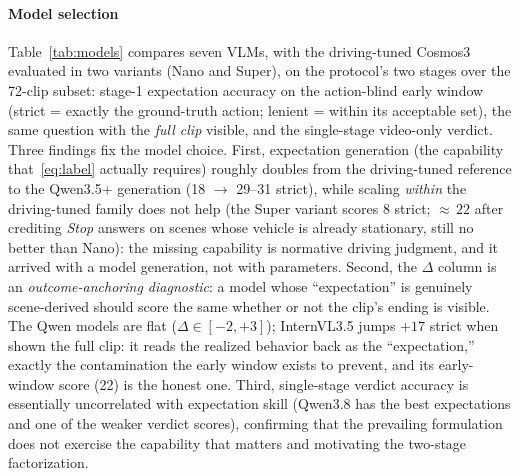 \documentclass[conference]{IEEEtran}
\begin{document}
\paragraph{Model selection} Table~\ref{tab:models} compares seven VLMs, with the driving-tuned Cosmos3 evaluated in two variants (Nano and Super), on the protocol's two stages over the 72-clip subset: stage-1 expectation accuracy on the action-blind early window (strict = exactly the ground-truth action; lenient = within its acceptable set), the same question with the \emph{full clip} visible, and the single-stage video-only verdict. Three findings fix the model choice. First, expectation generation (the capability that~\eqref{eq:label} actually requires) roughly doubles from the driving-tuned reference to the Qwen3.5+ generation (18 $\rightarrow$ 29--31 strict), while scaling \emph{within} the driving-tuned family does not help (the Super variant scores 8 strict; ${\approx}\,22$ after crediting \emph{Stop} answers on scenes whose vehicle is already stationary, still no better than Nano): the missing capability is normative driving judgment, and it arrived with a model generation, not with parameters. Second, the $\Delta$ column is an \emph{outcome-anchoring diagnostic}: a model whose ``expectation'' is genuinely scene-derived should score the same whether or not the clip's ending is visible. The Qwen models are flat ($\Delta \in [-2, +3]$); InternVL3.5 jumps $+17$ strict when shown the full clip: it reads the realized behavior back as the ``expectation,'' exactly the contamination the early window exists to prevent, and its early-window score (22) is the honest one. Third, single-stage verdict accuracy is essentially uncorrelated with expectation skill (Qwen3.8 has the best expectations and one of the weaker verdict scores), confirming that the prevailing formulation does not exercise the capability that matters and motivating the two-stage factorization.
\end{document}
